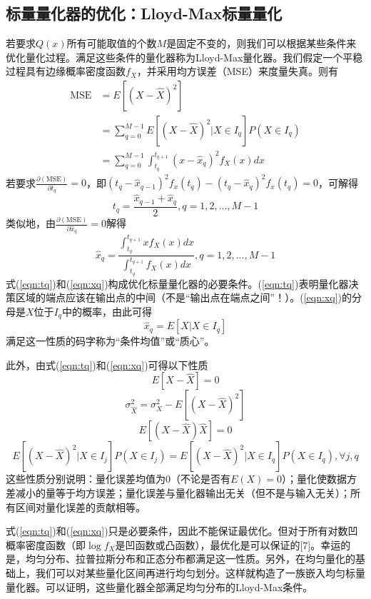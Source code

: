 \subsection{标量量化器的优化：Lloyd-Max标量量化}
若要求$Q(x)$所有可能取值的个数$M$是固定不变的，则我们可以根据某些条件来优化量化过程。满足这些条件的量化器称为Lloyd-Max量化器。我们假定一个平稳过程具有边缘概率密度函数$f_{X}$，并采用均方误差（MSE）来度量失真。则有
\begin{equation}
\begin{aligned}
\text{MSE}&=E\left[(X-\hat{X})^{2}\right]\\
&=\sum\limits_{q = 0}^{M - 1} {E\left[(X-\hat{X})^{2}|X \in I_{q}\right]P(X \in I_{q})}\\
&=\sum\limits_{q = 0}^{M - 1} {\int_{{t_q}}^{{t_{q+1}}} {{{(x - \hat{x}_q)}^2}{f_X}(x)dx} }
\end{aligned}
\end{equation}
若要求$\frac{\partial (\text{MSE})}{\partial {t_q}}=0$，即${({t_q} - \hat{x}_{q-1})^2}{f_x}({t_q}) - {({t_q} - \hat{x}_q)^2}{f_x}({t_q}) = 0$，可解得
\begin{equation}
t_q=\frac{\hat{x}_{q-1}+\hat{x}_{q}}{2}, q=1,2,...,M-1\label{eqn:tq}
\end{equation}
类似地，由$\frac{\partial (\text{MSE})}{\partial {\hat{x}_q}}=0$解得
\begin{equation}
\hat{x}_{q}=\frac{\int_{{t_q}}^{{t_{q+1}}} {x{f_X}(x)dx}}{\int_{{t_q}}^{{t_{q+1}}} {{f_X}(x)dx}}, q=1,2,...,M-1\label{eqn:xq}
\end{equation}
式(\ref{eqn:tq})和(\ref{eqn:xq})构成优化标量量化器的必要条件。(\ref{eqn:tq})表明量化器决策区域的端点应该在输出点的中间（不是“输出点在端点之间”！）。(\ref{eqn:xq})的分母是$X$位于$I_{q}$中的概率，由此可得
\begin{equation}
\hat{x}_q=E\left[X|X \in I_{q}\right]
\end{equation}
满足这一性质的码字称为“条件均值”或“质心”。\par
此外，由式(\ref{eqn:tq})和(\ref{eqn:xq})可得以下性质
\begin{equation}
E[X-\hat{X}]=0
\end{equation}
\begin{equation}
\sigma_{\hat{X}}^2= \sigma_{X}^2-E[(X-\hat{X})^2]
\end{equation}
\begin{equation}
E[(X-\hat{X})\hat{X}]=0
\end{equation}
\begin{equation}
E[(X-\hat{X})^2|X \in I_{j}]P(X \in I_{j})=E[(X-\hat{X})^2|X \in I_{q}]P(X \in I_{q}), \forall j,q
\end{equation}
这些性质分别说明：量化误差均值为0（不论是否有$E(X)=0$）；量化使数据方差减小的量等于均方误差；量化误差与量化器输出无关（但不是与输入无关）；所有区间对量化误差的贡献相等。\par
式(\ref{eqn:tq})和(\ref{eqn:xq})只是必要条件，因此不能保证最优化。但对于所有对数凹概率密度函数（即$\log f_{X}$是凹函数或凸函数），最优化是可以保证的[7]。幸运的是，均匀分布、拉普拉斯分布和正态分布都满足这一性质。另外，在均匀量化的基础上，我们可以对某些量化区间再进行均匀划分。这样就构造了一族嵌入均匀标量量化器。可以证明，这些量化器全部满足均匀分布的Lloyd-Max条件。

